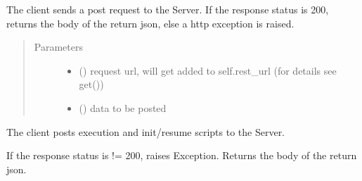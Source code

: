 \documentclass[letterpaper,10pt,english,openany,oneside]{sphinxmanual}
\begin{document}
\begin{fulllineitems}
\begin{fulllineitems}
\end{fulllineitems}


\begin{fulllineitems}
\label{\detokenize{_modules/AconitySTUDIO_client:AconitySTUDIO_client.AconitySTUDIO_client.post}}
The client sends a post request to the Server.
If the response status is 200, returns the body of the return json,
else a http exception is raised.
\begin{quote}\begin{description}
\item[{Parameters}] \leavevmode\begin{itemize}
\item {} 
 () \textendash{} request url, will get added to self.rest\_url (for details see get())

\item {} 
 () \textendash{} data to be posted

\end{itemize}

\end{description}\end{quote}

\end{fulllineitems}


\begin{fulllineitems}
\label{\detokenize{_modules/AconitySTUDIO_client:AconitySTUDIO_client.AconitySTUDIO_client.post_script}}
The client posts execution and init/resume scripts to the Server.

If the response status is != 200, raises Exception.
Returns the body of the return json.


\end{fulllineitems}
\end{fulllineitems}
\end{document}
